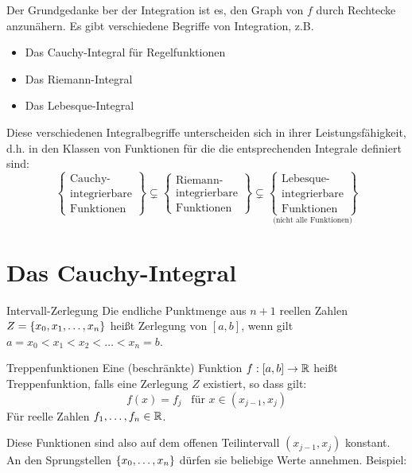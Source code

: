 Der Grundgedanke ber der Integration ist es, den Graph von $f$ durch Rechtecke anzunähern. Es gibt verschiedene Begriffe von Integration, z.B.
\begin{itemize}
	\item Das Cauchy-Integral für Regelfunktionen
	\item Das Riemann-Integral
	\item Das Lebesque-Integral
\end{itemize}
Diese verschiedenen Integralbegriffe unterscheiden sich in ihrer Leistungsfähigkeit, d.h. in den Klassen von Funktionen für die die entsprechenden Integrale definiert sind:
$$
	\begin{Bmatrix}
		\text{Cauchy-}\\
		\text{integrierbare}\\
		\text{Funktionen}
\end{Bmatrix}\subsetneq
\begin{Bmatrix}
	\text{Riemann-}\\
	\text{integrierbare}\\
	\text{Funktionen}
\end{Bmatrix}\subsetneq
\underset{\text{(nicht alle Funktionen)}}{\begin{Bmatrix}
	\text{Lebesque-}\\
	\text{integrierbare}\\
	\text{Funktionen}
\end{Bmatrix}}
$$

\section{Das Cauchy-Integral}
\begin{definition}{Intervall-Zerlegung}
	Die endliche Punktmenge aus $n+1$ reellen Zahlen $Z=\left\{ x_0,x_1,\ldots,x_n \right\}$ heißt Zerlegung von $[a,b]$, wenn gilt
		$a=x_0<x_1<x_2<\ldots<x_n=b$.
\end{definition}


\begin{definition}{Treppenfunktionen}
	Eine (beschränkte) Funktion $f:[a,b]\rightarrow \mathbb{R}$ heißt Treppenfunktion, falls eine Zerlegung $Z$ existiert, so dass gilt:
	\begin{equation*}
		f(x)=f_j\enspace\text{ für }x\in(x_{j-1},x_j)
	\end{equation*}
	Für reelle Zahlen $f_1,\ldots,f_n\in\mathbb{R}$.
\end{definition}

Diese Funktionen sind also auf dem offenen Teilintervall $(x_{j-1},x_j)$ konstant. An den Sprungstellen $\left\{ x_0,\ldots,x_n \right\}$ dürfen sie beliebige Werte annehmen. Beispiel:

